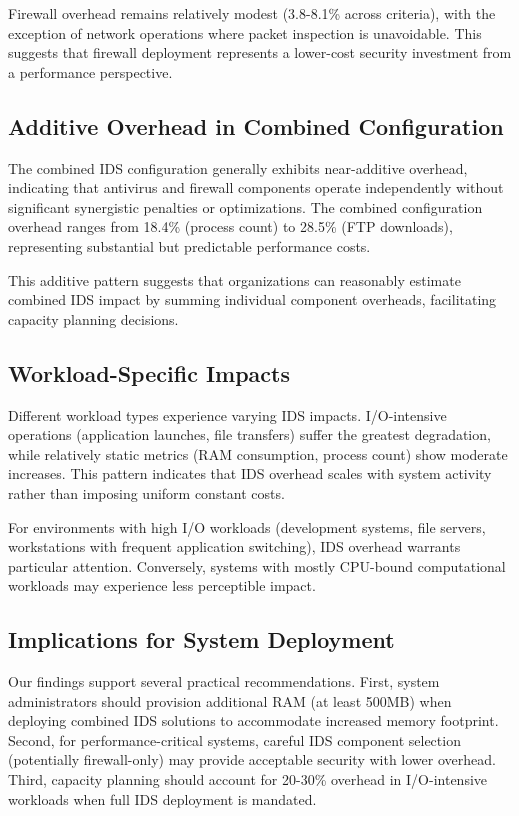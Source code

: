 \documentclass[runningheads,a4paper,english]{llncs}[2022/01/12]
\begin{document}
Firewall overhead remains relatively modest (3.8-8.1\% across criteria), with the exception of network operations where packet inspection is unavoidable. This suggests that firewall deployment represents a lower-cost security investment from a performance perspective.

\subsection{Additive Overhead in Combined Configuration}

The combined IDS configuration generally exhibits near-additive overhead, indicating that antivirus and firewall components operate independently without significant synergistic penalties or optimizations. The combined configuration overhead ranges from 18.4\% (process count) to 28.5\% (FTP downloads), representing substantial but predictable performance costs.

This additive pattern suggests that organizations can reasonably estimate combined IDS impact by summing individual component overheads, facilitating capacity planning decisions.

\subsection{Workload-Specific Impacts}

Different workload types experience varying IDS impacts. I/O-intensive operations (application launches, file transfers) suffer the greatest degradation, while relatively static metrics (RAM consumption, process count) show moderate increases. This pattern indicates that IDS overhead scales with system activity rather than imposing uniform constant costs.

For environments with high I/O workloads (development systems, file servers, workstations with frequent application switching), IDS overhead warrants particular attention. Conversely, systems with mostly CPU-bound computational workloads may experience less perceptible impact.

\subsection{Implications for System Deployment}

Our findings support several practical recommendations. First, system administrators should provision additional RAM (at least 500MB) when deploying combined IDS solutions to accommodate increased memory footprint. Second, for performance-critical systems, careful IDS component selection (potentially firewall-only) may provide acceptable security with lower overhead. Third, capacity planning should account for 20-30\% overhead in I/O-intensive workloads when full IDS deployment is mandated.
\end{document}
